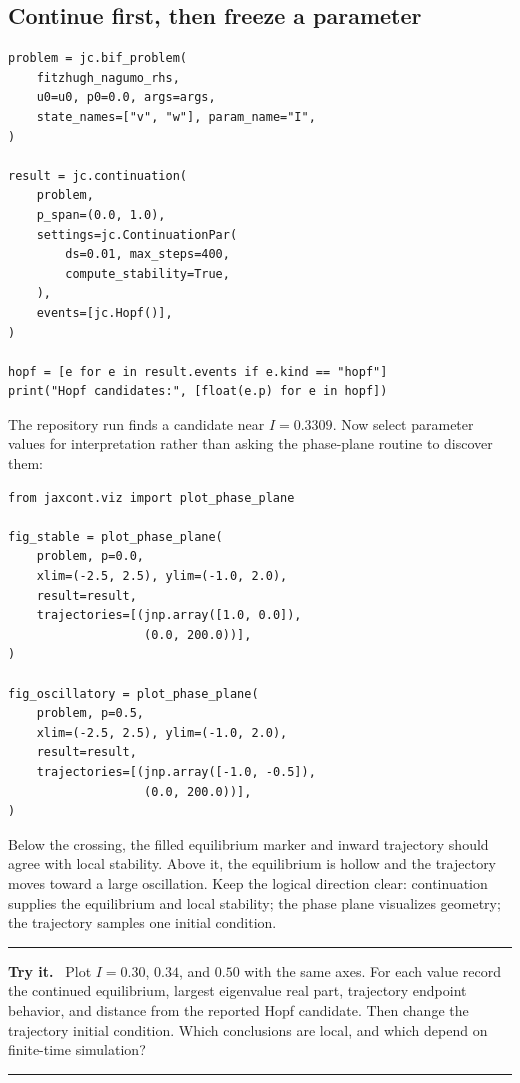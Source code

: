 \documentclass[11pt,oneside]{book}
\newenvironment{trythis}
  {\par\medskip\noindent\begin{minipage}{\textwidth}
   \color{JaxTeal}\rule{\textwidth}{0.8pt}\par
   \textbf{Try it.}\ \color{black}}
  {\par\color{JaxTeal}\rule{\textwidth}{0.8pt}
   \end{minipage}\par\medskip}
\begin{document}
\subsection{Continue first, then freeze a parameter}

\begin{lstlisting}
problem = jc.bif_problem(
    fitzhugh_nagumo_rhs,
    u0=u0, p0=0.0, args=args,
    state_names=["v", "w"], param_name="I",
)

result = jc.continuation(
    problem,
    p_span=(0.0, 1.0),
    settings=jc.ContinuationPar(
        ds=0.01, max_steps=400,
        compute_stability=True,
    ),
    events=[jc.Hopf()],
)

hopf = [e for e in result.events if e.kind == "hopf"]
print("Hopf candidates:", [float(e.p) for e in hopf])
\end{lstlisting}

The repository run finds a candidate near $I=0.3309$. Now select parameter
values for interpretation rather than asking the phase-plane routine to
discover them:

\begin{lstlisting}
from jaxcont.viz import plot_phase_plane

fig_stable = plot_phase_plane(
    problem, p=0.0,
    xlim=(-2.5, 2.5), ylim=(-1.0, 2.0),
    result=result,
    trajectories=[(jnp.array([1.0, 0.0]),
                   (0.0, 200.0))],
)

fig_oscillatory = plot_phase_plane(
    problem, p=0.5,
    xlim=(-2.5, 2.5), ylim=(-1.0, 2.0),
    result=result,
    trajectories=[(jnp.array([-1.0, -0.5]),
                   (0.0, 200.0))],
)
\end{lstlisting}

Below the crossing, the filled equilibrium marker and inward trajectory should
agree with local stability. Above it, the equilibrium is hollow and the
trajectory moves toward a large oscillation. Keep the logical direction
clear: continuation supplies the equilibrium and local stability; the phase
plane visualizes geometry; the trajectory samples one initial condition.

\begin{trythis}
Plot $I=0.30$, $0.34$, and $0.50$ with the same axes. For each value record the
continued equilibrium, largest eigenvalue real part, trajectory endpoint
behavior, and distance from the reported Hopf candidate. Then change the
trajectory initial condition. Which conclusions are local, and which depend
on finite-time simulation?
\end{trythis}
\end{document}
